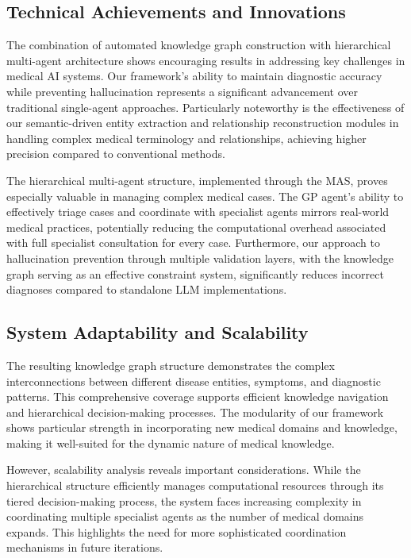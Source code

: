 \documentclass[letterpaper]{article} %
\begin{document}
\subsection{Technical Achievements and Innovations}
The combination of automated knowledge graph construction with hierarchical multi-agent architecture shows encouraging results in addressing key challenges in medical AI systems. Our framework's ability to maintain diagnostic accuracy while preventing hallucination represents a significant advancement over traditional single-agent approaches. Particularly noteworthy is the effectiveness of our semantic-driven entity extraction and relationship reconstruction modules in handling complex medical terminology and relationships, achieving higher precision compared to conventional methods.

The hierarchical multi-agent structure, implemented through the MAS, proves especially valuable in managing complex medical cases. The GP agent's ability to effectively triage cases and coordinate with specialist agents mirrors real-world medical practices, potentially reducing the computational overhead associated with full specialist consultation for every case. Furthermore, our approach to hallucination prevention through multiple validation layers, with the knowledge graph serving as an effective constraint system, significantly reduces incorrect diagnoses compared to standalone LLM implementations.

\subsection{System Adaptability and Scalability}
The resulting knowledge graph structure demonstrates the complex interconnections between different disease entities, symptoms, and diagnostic patterns. This comprehensive coverage supports efficient knowledge navigation and hierarchical decision-making processes. The modularity of our framework shows particular strength in incorporating new medical domains and knowledge, making it well-suited for the dynamic nature of medical knowledge.

However, scalability analysis reveals important considerations. While the hierarchical structure efficiently manages computational resources through its tiered decision-making process, the system faces increasing complexity in coordinating multiple specialist agents as the number of medical domains expands. This highlights the need for more sophisticated coordination mechanisms in future iterations.
\end{document}
